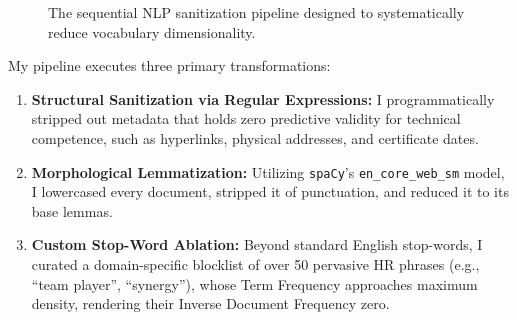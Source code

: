 \begin{figure}[htbp]
    \centering
    \caption{The sequential NLP sanitization pipeline designed to systematically reduce vocabulary dimensionality.}
    \label{fig:nlp_pipeline}
\end{figure}

My pipeline executes three primary transformations:
\begin{enumerate}
    \item \textbf{Structural Sanitization via Regular Expressions:} I programmatically stripped out metadata that holds zero predictive validity for technical competence, such as hyperlinks, physical addresses, and certificate dates.
    \item \textbf{Morphological Lemmatization:} Utilizing \texttt{spaCy}'s \texttt{en\_core\_web\_sm} model, I lowercased every document, stripped it of punctuation, and reduced it to its base lemmas.
    \item \textbf{Custom Stop-Word Ablation:} Beyond standard English stop-words, I curated a domain-specific blocklist of over 50 pervasive HR phrases (e.g., ``team player'', ``synergy''), whose Term Frequency approaches maximum density, rendering their Inverse Document Frequency zero.
\end{enumerate}

